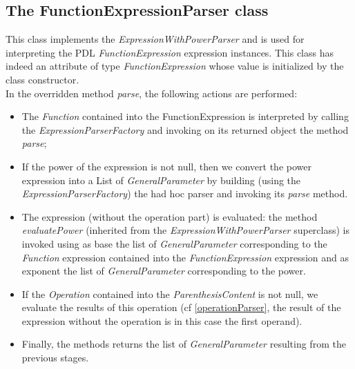 \documentclass[a4paper,11pt] {ivoa}
\begin{document}
\subsection{The FunctionExpressionParser class}
This class implements the {\it ExpressionWithPowerParser} and is used for interpreting the PDL {\it  FunctionExpression} expression instances. This class has indeed an attribute of type {\it FunctionExpression} whose value is initialized by the class constructor.\\
In the overridden method {\it parse}, the following actions are performed:
\begin{itemize}
\item The {\it Function} contained into the FunctionExpression is interpreted by calling the {\it ExpressionParserFactory} and invoking on its returned object the method {\it parse};
\item  If the power of the expression is not null, then we convert the power expression into a List of {\it GeneralParameter} by building (using the {\it ExpressionParserFactory}) the had hoc parser and invoking its {\it parse} method.
\item The expression (without the operation part) is evaluated:  the method {\it evaluatePower} (inherited from the {\it ExpressionWithPowerParser} superclass) is invoked using as base the list of {\it GeneralParameter} corresponding to the {\it Function} expression contained into the {\it FunctionExpression} expression  and as exponent the list of {\it GeneralParameter} corresponding to the power.
\item  If the {\it Operation} contained into the {\it ParenthesisContent}  is not null, we evaluate the results of this operation (cf \ref{operationParser}, the result of the expression without the operation is in this case the first operand).
\item Finally, the methods returns the list of {\it GeneralParameter} resulting from the previous stages.
\end{itemize}
\end{document}
